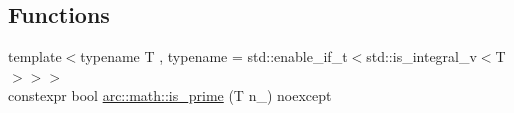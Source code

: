 \subsection*{Functions}
\begin{DoxyCompactItemize}
\item 
{\footnotesize template$<$typename T , typename  = std\+::enable\+\_\+if\+\_\+t$<$std\+::is\+\_\+integral\+\_\+v$<$\+T$>$$>$$>$ }\\constexpr bool \mbox{\hyperlink{namespacearc_1_1math_a7ff4593bf0cd78256420945b27713bcc}{arc\+::math\+::is\+\_\+prime}} (T n\+\_\+) noexcept
\end{DoxyCompactItemize}
